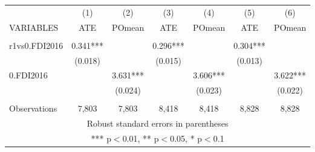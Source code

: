 \documentclass[]{article}
\begin{document}
\begin{tabular}{lcccccc} \hline
 & (1) & (2) & (3) & (4) & (5) & (6) \\
VARIABLES & ATE & POmean & ATE & POmean & ATE & POmean \\ \hline
 &  &  &  &  &  &  \\
r1vs0.FDI2016 & 0.341*** &  & 0.296*** &  & 0.304*** &  \\
 & (0.018) &  & (0.015) &  & (0.013) &  \\
0.FDI2016 &  & 3.631*** &  & 3.606*** &  & 3.622*** \\
 &  & (0.024) &  & (0.023) &  & (0.022) \\
 &  &  &  &  &  &  \\
 Observations & 7,803 & 7,803 & 8,418 & 8,418 & 8,828 & 8,828 \\ \hline
\multicolumn{7}{c}{ Robust standard errors in parentheses} \\
\multicolumn{7}{c}{ *** p$<$0.01, ** p$<$0.05, * p$<$0.1} \\
\end{tabular}
\end{document}
